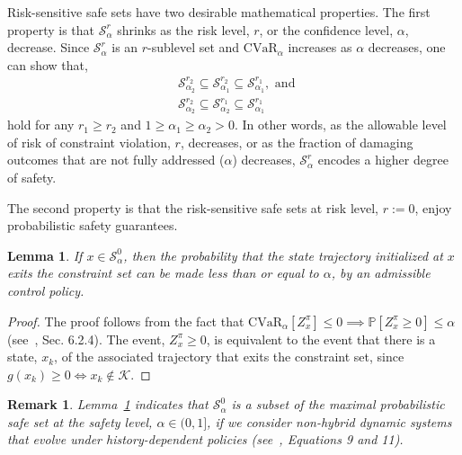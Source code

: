 \documentclass[letterpaper, 10 pt, conference]{ieeeconf}  %
\newtheorem{lemma}{Lemma}
\newtheorem{remark}{Remark}
\begin{document}
Risk-sensitive safe sets have two desirable mathematical properties.
The first property is that $\mathcal{S}_\alpha^r$ shrinks as the risk level, $r$, or the confidence level, $\alpha$, decrease.
Since $\mathcal{S}_\alpha^r$ is an $r$-sublevel set and $\text{CVaR}_\alpha$ increases as $\alpha$ decreases,
one can show that,
\begin{equation}\begin{aligned}
& \mathcal{S}_{\alpha_2}^{r_2} \subseteq \mathcal{S}_{\alpha_1}^{r_2} \subseteq \mathcal{S}_{\alpha_1}^{r_1}, \text{ and } \\
& \mathcal{S}_{\alpha_2}^{r_2} \subseteq \mathcal{S}_{\alpha_2}^{r_1} \subseteq \mathcal{S}_{\alpha_1}^{r_1}
\end{aligned}\end{equation}
hold for any $r_1 \geq r_2$ and $1 \geq \alpha_1 \geq \alpha_2 > 0$.
In other words, as the allowable level of risk of constraint violation, $r$, decreases, or as the fraction of damaging outcomes that are not fully addressed ($\alpha$) decreases,
$\mathcal{S}_\alpha^r$ encodes a higher degree of safety.

The second property is that the risk-sensitive safe sets at risk level, $r := 0$, enjoy probabilistic safety guarantees.
\begin{lemma}\label{mylemma1}
If $x \in \mathcal{S}_\alpha^0$, then the probability that the state trajectory initialized at $x$ exits the constraint set can be made
less than or equal to $\alpha$, by an admissible control policy.
\end{lemma}
\begin{proof}
The proof follows from the fact that $\text{CVaR}_\alpha[Z_x^\pi] \leq 0 \implies \mathbb{P}[Z_x^\pi\geq 0] \leq \alpha$ 
(see~\cite{shapiro2009lectures}, Sec. 6.2.4).
%
%
The event, $Z_x^\pi\geq 0$, is equivalent to the event that there is a state, $x_k$, of the associated trajectory
that exits the constraint set, since $g(x_k) \geq 0 \iff x_k \notin \mathcal{K}$.
%
%
\end{proof}
\begin{remark}{}
Lemma~\ref{mylemma1} indicates that $\mathcal{S}_\alpha^0$ is a subset of the \textit{maximal probabilistic safe set} at the safety level, $\alpha \in (0, 1]$, if we consider non-hybrid dynamic systems that evolve under history-dependent policies (see~\cite{abate2008probabilistic}, Equations 9 and 11).
\end{remark}
\end{document}
